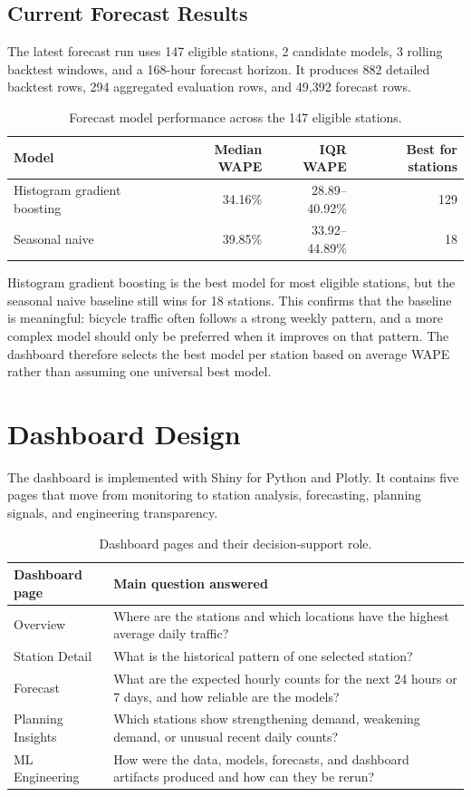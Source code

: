 \documentclass[11pt]{article}
\begin{document}
\subsection{Current Forecast Results}

The latest forecast run uses 147 eligible stations, 2 candidate models, 3 rolling backtest windows, and a 168-hour forecast horizon. It produces 882 detailed backtest rows, 294 aggregated evaluation rows, and 49,392 forecast rows.

\begin{table}[htbp]
\centering
\caption{Forecast model performance across the 147 eligible stations.}
\small
\begin{tabular}{lrrr}
\toprule
\textbf{Model} & \textbf{Median WAPE} & \textbf{IQR WAPE} & \textbf{Best for stations} \\
\midrule
Histogram gradient boosting & 34.16\% & 28.89--40.92\% & 129 \\
Seasonal naive & 39.85\% & 33.92--44.89\% & 18 \\
\bottomrule
\end{tabular}
\end{table}

Histogram gradient boosting is the best model for most eligible stations, but the seasonal naive baseline still wins for 18 stations. This confirms that the baseline is meaningful: bicycle traffic often follows a strong weekly pattern, and a more complex model should only be preferred when it improves on that pattern. The dashboard therefore selects the best model per station based on average WAPE rather than assuming one universal best model.

\section{Dashboard Design}

The dashboard is implemented with Shiny for Python and Plotly. It contains five pages that move from monitoring to station analysis, forecasting, planning signals, and engineering transparency.

\begin{table}[htbp]
\centering
\caption{Dashboard pages and their decision-support role.}
\small
\begin{tabularx}{0.96\textwidth}{lX}
\toprule
\textbf{Dashboard page} & \textbf{Main question answered} \\
\midrule
Overview & Where are the stations and which locations have the highest average daily traffic? \\
Station Detail & What is the historical pattern of one selected station? \\
Forecast & What are the expected hourly counts for the next 24 hours or 7 days, and how reliable are the models? \\
Planning Insights & Which stations show strengthening demand, weakening demand, or unusual recent daily counts? \\
ML Engineering & How were the data, models, forecasts, and dashboard artifacts produced and how can they be rerun? \\
\bottomrule
\end{tabularx}
\end{table}
\end{document}
